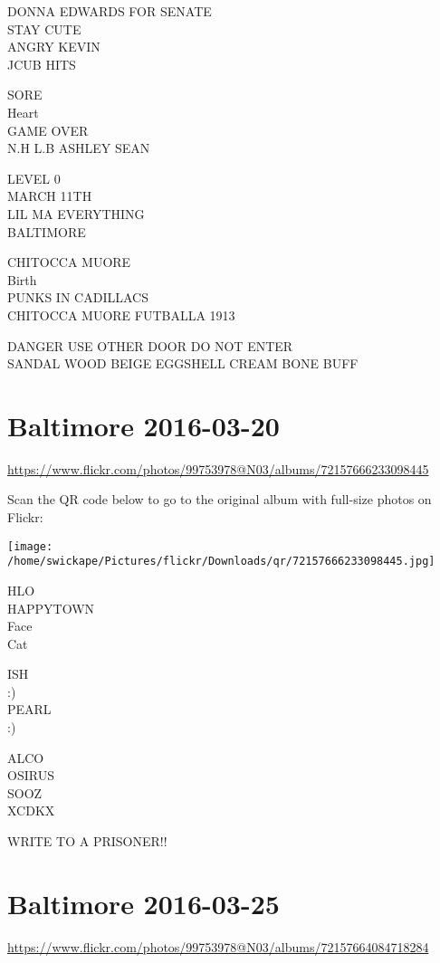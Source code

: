 \documentclass[10pt,letterpaper]{article}
\begin{document}
DONNA EDWARDS FOR SENATE\\
STAY CUTE\\
ANGRY KEVIN\\
JCUB HITS

SORE\\
Heart\\
GAME OVER\\
N.H L.B ASHLEY SEAN

LEVEL 0\\
MARCH 11TH\\
LIL MA EVERYTHING\\
BALTIMORE

CHITOCCA MUORE\\
Birth\\
PUNKS IN CADILLACS\\
CHITOCCA MUORE FUTBALLA 1913

DANGER USE OTHER DOOR DO NOT ENTER\\
SANDAL WOOD BEIGE EGGSHELL CREAM BONE BUFF


\section*{Baltimore 2016-03-20}

\url{https://www.flickr.com/photos/99753978@N03/albums/72157666233098445}

Scan the QR code below to go to the original album with full-size photos on Flickr:

\texttt{[image: /home/swickape/Pictures/flickr/Downloads/qr/72157666233098445.jpg]}


HLO\\
HAPPYTOWN\\
Face\\
Cat

ISH\\
:)\\
PEARL\\
:)

ALCO\\
OSIRUS\\
SOOZ\\
XCDKX

WRITE TO A PRISONER!!


\section*{Baltimore 2016-03-25}

\url{https://www.flickr.com/photos/99753978@N03/albums/72157664084718284}
\end{document}
